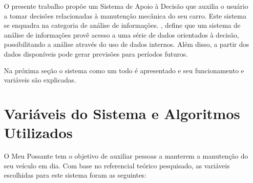 \documentclass[12pt]{article}
\begin{document}
O presente trabalho propõe um Sistema de Apoio à Decisão que auxilia o usuário
a tomar decisões relacionadas à manutenção mecânica do seu carro. Este sistema
se enquadra na categoria de análise de informações.
, define que um sistema de análise de informações
provê acesso a uma série de dados orientados à decisão, possibilitando a análise
através do uso de dados internos. Além disso, a partir dos dados disponíveis
pode gerar previsões para períodos futuros.

Na próxima seção o sistema como um todo é apresentado e seu funcionamento e
variáveis são explicadas.

\section{Variáveis do Sistema e Algoritmos Utilizados} \label{sec:algoritmos}
O Meu Possante tem o objetivo de auxiliar pessoas a manterem a manutenção do seu
veículo em dia. Com base no referencial teórico pesquisado, as variáveis
escolhidas para este sistema foram as seguintes:

\begin{table}[h]
\centering
{}
\caption{Quadro de variáveis utilizadas no sistema}
\label{quadro-variaveis}
\end{table}
\end{document}
